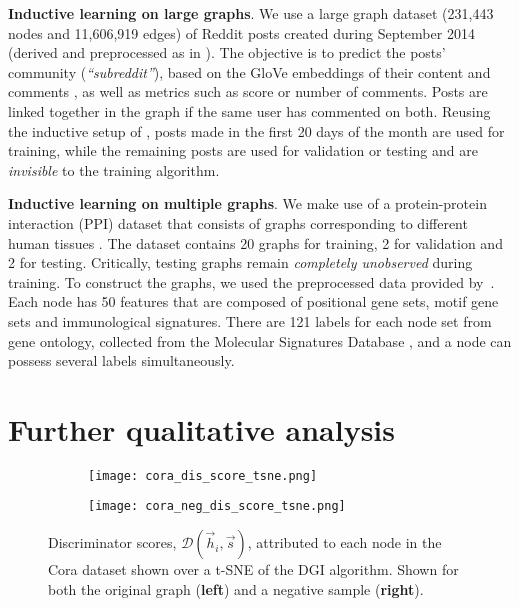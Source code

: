 \documentclass{article} \usepackage{iclr2019_conference,times}
\newcommand{\xhdr}[1]{{\noindent\bfseries #1}.}
\begin{document}
\xhdr{Inductive learning on large graphs}
We use a large graph dataset (231,443 nodes and 11,606,919 edges) of Reddit posts created during September 2014 (derived and preprocessed as in \cite{hamilton2017inductive}). The objective is to predict the posts' community (\emph{``subreddit''}), based on the GloVe embeddings of their content and comments \citep{pennington2014glove}, as well as metrics such as score or number of comments. Posts are linked together in the graph if the same user has commented on both. Reusing the inductive setup of \cite{hamilton2017inductive}, posts made in the first 20 days of the month are used for training, while the remaining posts are used for validation or testing and are \emph{invisible} to the training algorithm.

\xhdr{Inductive learning on multiple graphs}
We make use of a protein-protein interaction (PPI) dataset that consists of graphs corresponding to different human tissues \citep{zitnik2017predicting}. The dataset contains 20 graphs for training, 2 for validation and 2 for testing. Critically, testing graphs remain \emph{completely unobserved} during training. To construct the graphs, we used the preprocessed data provided by~\cite{hamilton2017inductive}. Each node has 50 features that are composed of positional gene sets, motif gene sets and immunological signatures. There are 121 labels for each node set from gene ontology, collected from the Molecular Signatures Database \citep{subramanian2005gene}, and a node can possess several labels simultaneously.

\section{Further qualitative analysis}\label{app:quali}

\begin{figure}
\centering
\begin{subfigure}{0.5\textwidth}
  \centering
  \texttt{[image: cora\_dis\_score\_tsne.png]}
\end{subfigure}\begin{subfigure}{0.5\textwidth}
  \centering
  \texttt{[image: cora\_neg\_dis\_score\_tsne.png]}
\end{subfigure}
\caption{Discriminator scores, $\mathcal{D}\left(\vec{h}_i, \vec{s}\right)$, attributed to each node in the Cora dataset shown over a t-SNE of the DGI algorithm. Shown for both the original graph ({\bf left}) and a negative sample ({\bf right}).}
\label{fig:cora_dis_score_tsne}
\end{figure}
\end{document}
